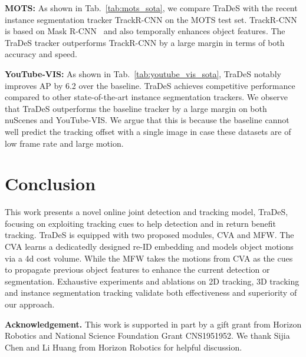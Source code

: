 \documentclass[final]{cvpr}
\newcommand{\myparagraph}[1]{{\vspace{0.5em} \noindent \bf #1}}
\begin{document}
\myparagraph{MOTS:} As shown in Tab.~\ref{tab:mots_sota}, we compare TraDeS with the recent instance segmentation tracker TrackR-CNN on the MOTS test set. TrackR-CNN is based on Mask R-CNN~\cite{he2017mask} and also temporally enhances object features. The TraDeS tracker outperforms TrackR-CNN by a large margin in terms of both accuracy and speed.

\myparagraph{YouTube-VIS:} As shown in Tab.~\ref{tab:youtube_vis_sota}, TraDeS notably improves AP by 6.2 over the baseline. TraDeS achieves competitive performance compared to other state-of-the-art instance segmentation trackers. We observe that TraDeS outperforms the baseline tracker by a large margin on both nuScenes and YouTube-VIS. We argue that this is because the baseline cannot well predict the tracking offset  with a single image in case these datasets are of low frame rate and large motion.


\vspace{-2mm}
\section{Conclusion}
\vspace{-2mm}
This work presents a novel online joint detection and tracking model, TraDeS, focusing on exploiting tracking cues to help detection and in return benefit tracking. TraDeS is equipped with two proposed modules, CVA and MFW. The CVA learns a dedicatedly designed re-ID embedding and models object motions via a 4d cost volume. While the MFW takes the motions from CVA as the cues to propagate previous object features to enhance the current detection or segmentation. Exhaustive experiments and ablations on 2D tracking, 3D tracking and instance segmentation tracking validate both effectiveness and superiority of our approach.

\myparagraph{Acknowledgement.} This work is supported in part by a gift grant from Horizon Robotics and National Science Foundation Grant CNS1951952. We thank Sijia Chen and Li Huang from Horizon Robotics for helpful discussion.


{\small


}
\end{document}
